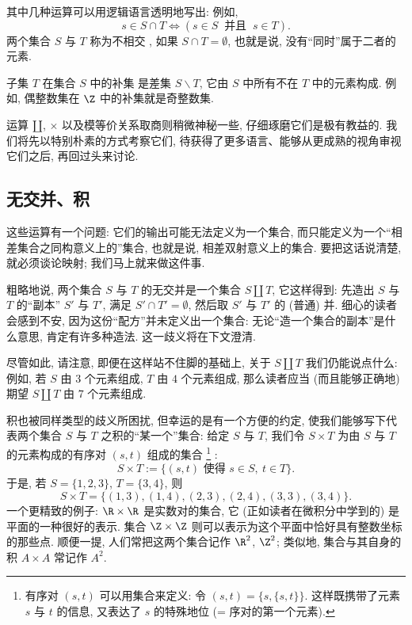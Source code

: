 其中几种运算可以用逻辑语言透明地写出: 例如,
\[
	s \in S \cap T \iff (s \in S \ \text{ 并且 } \ s \in T).
\]
两个集合 $S$ 与 $T$ 称为不相交%
, 如果 $S \cap T = \emptyset$, 也就是说, 没有``同时''属于二者的元素.

子集 $T$ 在集合 $S$ 中的补集%
是差集 $S \smallsetminus T$, 它由 $S$ 中所有不在 $T$ 中的元素构成. 例如, 偶整数集在 $\Z$ 中的补集就是奇整数集.

运算 $\amalg$, $\times$ 以及模等价关系取商则稍微神秘一些, 仔细琢磨它们是极有教益的. 我们将先以特别朴素的方式考察它们, 待获得了更多语言、能够从更成熟的视角审视它们之后, 再回过头来讨论.

\subsection{无交并、积}
\label{subsec:disjoint-unions-products}

这些运算有一个问题: 它们的输出可能无法定义为一个集合, 而只能定义为一个``相差集合之同构意义上的''集合, 也就是说, 相差双射意义上的集合. 要把这话说清楚, 就必须谈论映射; 我们马上就来做这件事.

粗略地说, 两个集合 $S$ 与 $T$ 的无交并是一个集合 $S \amalg T$, 它这样得到: 先造出 $S$ 与 $T$ 的``副本'' $S'$ 与 $T'$, 满足 $S' \cap T' = \emptyset$, 然后取 $S'$ 与 $T'$ 的 (普通) 并. 细心的读者会感到不安, 因为这份``配方''并未定义出一个集合: 无论``造一个集合的副本''是什么意思, 肯定有许多种造法. 这一歧义将在下文澄清.

尽管如此, 请注意, 即便在这样站不住脚的基础上, 关于 $S \amalg T$ 我们仍能说点什么: 例如, 若 $S$ 由 $3$ 个元素组成, $T$ 由 $4$ 个元素组成, 那么读者应当 (而且能够正确地) 期望 $S \amalg T$ 由 $7$ 个元素组成.

积也被同样类型的歧义所困扰, 但幸运的是有一个方便的约定, 使我们能够写下代表两个集合 $S$ 与 $T$ 之积的``某一个''集合: 给定 $S$ 与 $T$, 我们令 $S \times T$ 为由 $S$ 与 $T$ 的元素构成的有序对%
$(s,t)$ 组成的集合%
\footnote{有序对 $(s,t)$ 可以用集合来定义: 令 $(s,t) = \{s, \{s,t\}\}$. 这样既携带了元素 $s$ 与 $t$ 的信息, 又表达了 $s$ 的特殊地位 (= 序对的第一个元素).}%
:
\[
	S \times T := \{(s,t) \text{ 使得 } s \in S,\ t \in T\}.
\]
于是, 若 $S = \{1,2,3\}$, $T = \{3,4\}$, 则
\[
	S \times T = \{(1,3), (1,4), (2,3), (2,4), (3,3), (3,4)\}.
\]
一个更精致的例子: $\R \times \R$ 是实数对的集合, 它 (正如读者在微积分中学到的) 是平面的一种很好的表示. 集合 $\Z \times \Z$ 则可以表示为这个平面中恰好具有整数坐标的那些点. 顺便一提, 人们常把这两个集合记作 $\R^2$, $\Z^2$; 类似地, 集合与其自身的积 $A \times A$ 常记作 $A^2$.

